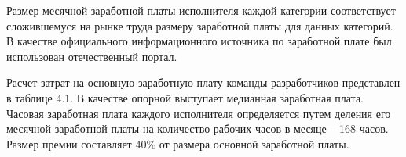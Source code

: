 Размер месячной заработной платы исполнителя каждой категории соответствует сложившемуся на рынке труда размеру заработной платы для данных категорий.
В качестве официального информационного источника по заработной плате был использован отечественный портал.

Расчет затрат на основную заработную плату команды разработчиков представлен в таблице 4.1.
В качестве опорной выступает медианная заработная плата.
Часовая заработная плата каждого исполнителя определяется путем деления его месячной заработной платы на количество рабочих часов в месяце – 168 часов.
Размер премии составляет 40\% от размера основной заработной платы.





\FPeval{\valtBA}{\valtMonth}



